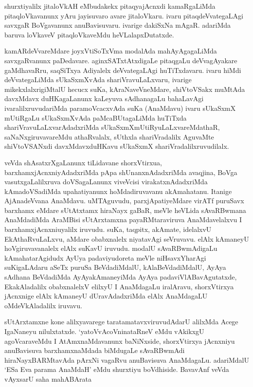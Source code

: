 \begin{artha}
shurxtiyalilx jitaloVkAH eMbudakekx pitaqyajAcnxdi kamaRgaLiMda pitaqloVkavanunx yAru jayisuvaro avare jitaloVkaru. ivaru pitaqdeVvategaLAgi savxgaR BoVgavanunx anuBavisuvaru. ivarige dakiSxNa mAgaR. adariMda baruva loVkaveV pitaqloVkaveMdu heVLalapxDutatxde. 
\end{artha}

\begin{artha}
kamARdeVvareMdare joyxVtiSoTxVma modalAda mahAyAgagaLiMda savxgaRvanunx paDedavare. aginxSATxtAtxdigaLe pitaqgaLu deVvagAyakare gaMdhavaRru, saqSiTxya Adiyalelx deVvategaLAgi huTiTxdavaru. ivaru hiMdi deVvategaLiMda sUkaSxmXvAda shariVravuLaLxvaru, ivarige mikekxlalxrigiMtalU hecucx suKa, kAraNaveVneMdare, shiVtoVSakx muMtAda davxMdavx duHKagaLanunx kaLeyuva sAdhanagaLu bahaLavAgi ivaralilxruvudariMda paramoVcacxvAda suKa (AnaMdavu) ivaru sUkaSxmX mUtiRgaLu sUkaSxmXvAda paMcaBUtagaLiMda huTiTxda shariVravuLaLxvarAdadxriMda sUkaSxmXmUtiRyuLaLxvareMdathaR, saNaNxgiruvavareMdu athaRvalalx, sUthxla shariVradalilx AguvaMte shiVtoVSANxdi davxMdavxduHKavu sUkaSxmX shariVradalilxruvudilalx. 
\end{artha}%

\begin{artha}
veVda shAsatxrXgaLanunx tiLidavane shorxVtirxua, barxhamxjAcnxniyAdadxriMda pApa shUnanxnAdadxriMda avaqjina, BoVga vasutxgaLalilxruva doVSagaLanunx viveVcisi virakatxnAdadxriMda kAmadoVSadiMda upahatiyanunx hoMdadiruvavanu akAmahatanu. Itanige AjAnadeVvana AnaMdavu. uMTAguvudu, parxjApatiyeMdare virATf puruSavx barxhamx eMdare sUtAtxtamx hiraNayx gaBaR, meVle heVLida sAvaRBwmana AnaMdadiMda AraMBisi sUtArxtamxna payaRMtaraviruva AnaMdavelalxvu I barxhamxjAcnxniuyalilx iruvudu. suKa, taqpitx, akAmate, idelalxvU EkAthaRvuLaLxvu, aMdare obabxnalelx niyatavAgi seVruvavu. elAlx kAmaneyU hoVgiruvavanalelx elAlx suKavU iruvudu. modalU sAvaRBwmAdigaLu kAmahatarAgidudx AyUya padaviyudoreta meVle niHsavxYharAgi suKigaLAdaru aSeTx puruSa BeVdadiMdalU, kAlaBeVdadiMdalU, AyAya sAdhana BeVdadiMda AyAyakAmaneyiMda AyAya padaviVlABavAgutatxde, EkakAladalilx obabxnalelxV elilxyU I AnaMdagaLu iralAravu, shorxVtirxya jAcnxnige elAlx kAmaneyU dUravAdadxriMda elAlx AnaMdagaLU oMdeVkAladalilx iruvavu. 
\end{artha}


\begin{artha}
sUtArxtamxne kone alilxyavarege taratamatavxviruvudAdarU alilxMda Acege IgaNaneyu nilulxtatxde. `yatoVvAcoVninataRneV eMdu vAkikxgU agoVcaraveMdu I AtAmxnaMdavanunx baNiNxside, shorxVtirxya jAcnxniyu anuBavisuva barxhamxnaMdada biMdugaLe sAvaRBwmAdi hiraNayxBARMtavAda pArxNi vagaRvu anuBavisuva AnaMdagaLu. adariMdalU `ESa Eva parama AnaMdaH' eMdu shurxtiyu boVdhiside. BavavAnf veVda vAyxsarU saha mahABArata 
\end{artha}%

